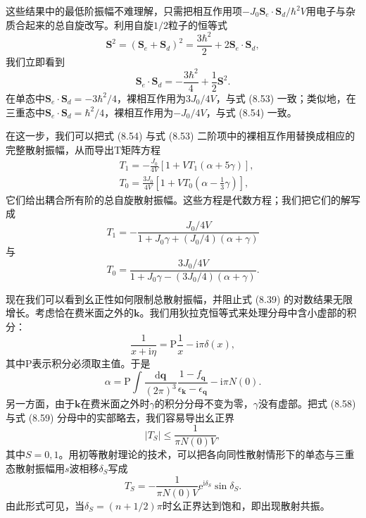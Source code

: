 这些结果中的最低阶振幅不难理解，只需把相互作用项$-J_0\mathbf{S}_e\cdot\mathbf{S}_d/\hbar^2 V$用电子与杂质合起来的总自旋改写。利用自旋$1/2$粒子的恒等式
\begin{equation*}
\mathbf{S}^2 = (\mathbf{S}_e+\mathbf{S}_d)^2 = \frac{3\hbar^2}{2}+2\mathbf{S}_e\cdot\mathbf{S}_d,
\tag{8.55}
\end{equation*}
我们立即看到
\begin{equation*}
\mathbf{S}_e\cdot\mathbf{S}_d = -\frac{3\hbar^2}{4}+\frac{1}{2}\mathbf{S}^2.
\tag{8.56}
\end{equation*}
在单态中$\mathbf{S}_e\cdot\mathbf{S}_d=-3\hbar^2/4$，裸相互作用为$3J_0/4V$，与式 (8.53) 一致；类似地，在三重态中$\mathbf{S}_e\cdot\mathbf{S}_d=\hbar^2/4$，裸相互作用为$-J_0/4V$，与式 (8.54) 一致。

在这一步，我们可以把式 (8.54) 与式 (8.53) 二阶项中的裸相互作用替换成相应的完整散射振幅，从而导出T矩阵方程
\begin{equation*}
\begin{aligned}
&T_1 = -\frac{J_0}{4V}\left[1+VT_1(\alpha+5\gamma)\right],\\
&T_0 = \frac{3J_0}{4V}\left[1+VT_0\left(\alpha-\frac{1}{3}\gamma\right)\right],
\end{aligned}
\tag{8.57}
\end{equation*}
它们给出耦合所有阶的总自旋散射振幅。这些方程是代数方程；我们把它们的解写成
\begin{equation*}
T_1 = -\frac{J_0/4V}{1+J_0\gamma+(J_0/4)(\alpha+\gamma)}
\tag{8.58}
\end{equation*}
与
\begin{equation*}
T_0 = \frac{3J_0/4V}{1+J_0\gamma-(3J_0/4)(\alpha+\gamma)}.
\tag{8.59}
\end{equation*}

现在我们可以看到幺正性如何限制总散射振幅，并阻止式 (8.39) 的对数结果无限增长。考虑恰在费米面之外的$\mathbf{k}$。我们用狄拉克恒等式来处理分母中含小虚部的积分：
\begin{equation*}
\frac{1}{x+\mathrm{i}\eta} = \mathrm{P}\frac{1}{x}-\mathrm{i}\pi\delta(x),
\tag{8.60}
\end{equation*}
其中P表示积分必须取主值。于是
\begin{equation*}
\alpha = \mathrm{P}\int\frac{\mathrm{d}\mathbf{q}}{(2\pi)^3}\frac{1-f_{\mathbf{q}}}{\epsilon_{\mathbf{k}}-\epsilon_{\mathbf{q}}}-\mathrm{i}\pi N(0).
\tag{8.61}
\end{equation*}
另一方面，由于$\mathbf{k}$在费米面之外时$\gamma$的积分分母不变为零，$\gamma$没有虚部。把式 (8.58) 与式 (8.59) 分母中的实部略去，我们容易导出幺正界
\begin{equation*}
|T_S|\leq\frac{1}{\pi N(0)V},
\tag{8.62}
\end{equation*}
其中$S=0,1$。用初等散射理论的技术，可以把各向同性散射情形下的单态与三重态散射振幅用$s$波相移$\delta_S$写成
\begin{equation*}
T_S = -\frac{1}{\pi N(0)V}\mathrm{e}^{\mathrm{i}\delta_S}\sin\delta_S.
\tag{8.63}
\end{equation*}
由此形式可见，当$\delta_S=(n+1/2)\pi$时幺正界达到饱和，即出现散射共振。

